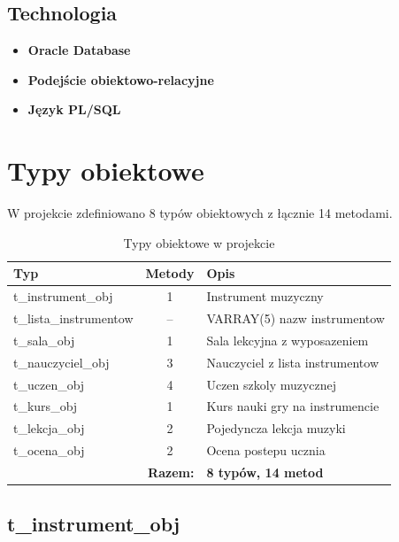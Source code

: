 \documentclass[12pt,a4paper]{article}
\begin{document}
\subsection{Technologia}

\begin{itemize}
    \item \textbf{Oracle Database}
    \item \textbf{Podejście obiektowo-relacyjne}
    \item \textbf{Język PL/SQL}
\end{itemize}

\newpage
\section{Typy obiektowe}

W projekcie zdefiniowano 8 typów obiektowych z łącznie 14 metodami.

\begin{table}[h]
\centering
\begin{tabular}{|l|c|p{7cm}|}
\hline
\textbf{Typ} & \textbf{Metody} & \textbf{Opis} \\
\hline
t\_instrument\_obj & 1 & Instrument muzyczny \\
t\_lista\_instrumentow & -- & VARRAY(5) nazw instrumentow \\
t\_sala\_obj & 1 & Sala lekcyjna z wyposazeniem \\
t\_nauczyciel\_obj & 3 & Nauczyciel z lista instrumentow \\
t\_uczen\_obj & 4 & Uczen szkoly muzycznej \\
t\_kurs\_obj & 1 & Kurs nauki gry na instrumencie \\
t\_lekcja\_obj & 2 & Pojedyncza lekcja muzyki \\
t\_ocena\_obj & 2 & Ocena postepu ucznia \\
\hline
\multicolumn{2}{|r|}{\textbf{Razem:}} & \textbf{8 typów, 14 metod} \\
\hline
\end{tabular}
\caption{Typy obiektowe w projekcie}
\end{table}

\subsection{t\_instrument\_obj}
\end{document}
